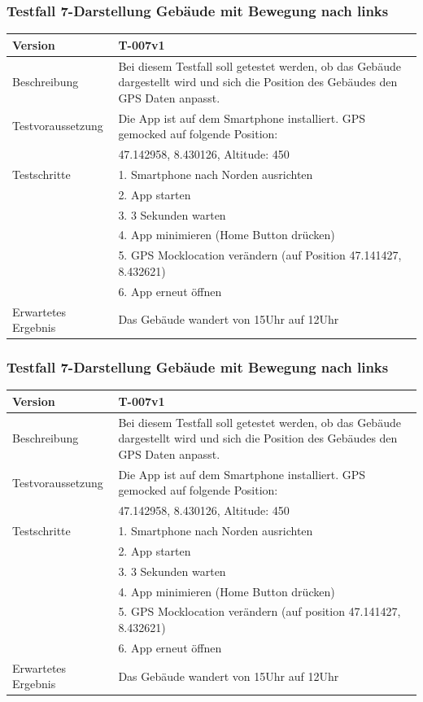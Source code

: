 \documentclass[a4paper]{scrreprt}
\begin{document}
\subsubsection{Testfall 7-Darstellung Gebäude mit Bewegung nach links}
\begin{tabularx}{\textwidth}{|l|X|}
\hline 
	Version &
	T-007v1 \\ 
\hline 
	Beschreibung & 
	Bei diesem Testfall soll getestet werden, ob das Gebäude dargestellt wird und sich die Position des Gebäudes den GPS Daten anpasst. \\ 
\hline 
	Testvoraussetzung &
	Die App ist auf dem Smartphone installiert. GPS gemocked auf folgende Position: \\ &
		47.142958, 8.430126, Altitude: 450 \\ 
\hline 
	Testschritte & 
		1. Smartphone nach Norden ausrichten \\ &
		2. App starten \\ &
		3. 3 Sekunden warten \\ &
		4. App minimieren (Home Button drücken) \\ &
		5. GPS Mocklocation verändern (auf Position  47.141427, 8.432621) \\ &
		6. App erneut öffnen \\
\hline
	Erwartetes Ergebnis &
	Das Gebäude wandert von 15Uhr auf 12Uhr \\ 
\hline 
\end{tabularx}
\subsubsection{Testfall 7-Darstellung Gebäude mit Bewegung nach links}
\begin{tabularx}{\textwidth}{|l|X|}
\hline 
	Version &
	T-007v1 \\ 
\hline 
	Beschreibung & 
	Bei diesem Testfall soll getestet werden, ob das Gebäude dargestellt wird und sich die Position des Gebäudes den GPS Daten anpasst. \\ 
\hline 
	Testvoraussetzung &
	Die App ist auf dem Smartphone installiert. GPS gemocked auf folgende Position: \\ &
		47.142958, 8.430126, Altitude: 450 \\ 
\hline 
	Testschritte & 
		1. Smartphone nach Norden ausrichten \\ &
		2. App starten \\ &
		3. 3 Sekunden warten \\ &
4. App minimieren (Home Button drücken) \\ &
		5. GPS Mocklocation verändern (auf position  47.141427, 8.432621) \\ &
		6. App erneut öffnen \\
\hline
	Erwartetes Ergebnis &
	Das Gebäude wandert von 15Uhr auf 12Uhr \\ 
\hline 
\end{tabularx}
\end{document}
